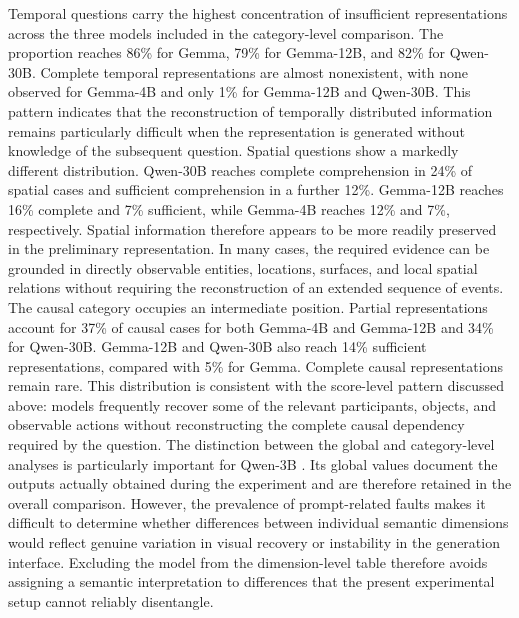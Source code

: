 Temporal questions carry the highest concentration of insufficient representations across the three models included in the category-level comparison. The proportion reaches 86\% for Gemma, 79\% for Gemma-12B, and 82\% for Qwen-30B. Complete temporal representations are almost nonexistent, with none observed for Gemma-4B    and only 1\% for Gemma-12B and Qwen-30B. This pattern indicates that the reconstruction of temporally distributed information remains particularly difficult when the representation is generated without knowledge of the subsequent question.
Spatial questions show a markedly different distribution. Qwen-30B reaches complete comprehension in 24\% of spatial cases and sufficient comprehension in a further 12\%. Gemma-12B reaches 16\% complete and 7\% sufficient, while Gemma-4B    reaches 12\% and 7\%, respectively. Spatial information therefore appears to be more readily preserved in the preliminary representation. In many cases, the required evidence can be grounded in directly observable entities, locations, surfaces, and local spatial relations without requiring the reconstruction of an extended sequence of events.
The causal category occupies an intermediate position. Partial representations account for 37\% of causal cases for both Gemma-4B    and Gemma-12B and 34\% for Qwen-30B. Gemma-12B and Qwen-30B also reach 14\% sufficient representations, compared with 5\% for Gemma. Complete causal representations remain rare. This distribution is consistent with the score-level pattern discussed above: models frequently recover some of the relevant participants, objects, and observable actions without reconstructing the complete causal dependency required by the question.
The distinction between the global and category-level analyses is particularly important for Qwen-3B . Its global values document the outputs actually obtained during the experiment and are therefore retained in the overall comparison. However, the prevalence of prompt-related faults makes it difficult to determine whether differences between individual semantic dimensions would reflect genuine variation in visual recovery or instability in the generation interface. Excluding the model from the dimension-level table therefore avoids assigning a semantic interpretation to differences that the present experimental setup cannot reliably disentangle.
